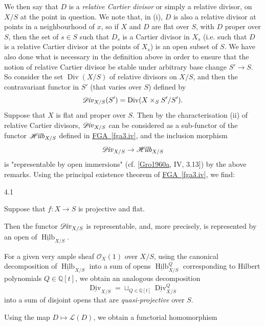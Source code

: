   We then say that \(D\) is a \emph{relative Cartier divisor} or simply a relative divisor, on \(X/S\) at the point in question.
  We note that, in (i), \(D\) is also a relative divisor at points in a neighbourhood of \(x\), so if \(X\) and \(D\) are flat over \(S\), with \(D\) proper over \(S\), then the set of \(s\in  S\) such that \(D_s\) is a Cartier divisor in \(X_s\) (i.e. such that \(D\) is a relative Cartier divisor at the points of \(X_s\)) is an open subset of \(S\).
  We have also done what is necessary in the definition above in order to ensure that the notion of relative Cartier divisor be stable under arbitrary base change \(S'\to  S\).
  So consider the set \(\operatorname {Div}(X/S)\) of relative divisors on \(X/S\), and then the contravariant functor in \(S'\) (that varies over \(S\)) defined by
  \[     \mathscr {D}\kern  -1pt\mathit {iv}_{X/S}(S')     = \operatorname {Div}(X\times _S S'/S').   \]
  Suppose that \(X\) is flat and proper over \(S\).
  Then by the characterisation (ii) of relative Cartier divisors, \(\mathscr {D}\kern  -1pt\mathit {iv}_{X/S}\) can be considered as a sub-functor of the functor \(\mathscr {H}\kern  -1.75pt\mathit {ilb}_{X/S}\) defined in \hyperref[fga3.iv]{FGA~\ref*{fga3.iv}}, and the inclusion morphism
  \[     \mathscr {D}\kern  -1pt\mathit {iv}_{X/S}     \to  \mathscr {H}\kern  -1.75pt\mathit {ilb}_{X/S}   \]
  is "representable by open immersions" (cf. [\hyperref[Gro1960a]{Gro1960a}, IV, 3.13]) by the above remarks.
  Using the principal existence theorem of \hyperref[fga3.iv]{FGA~\ref*{fga3.iv}}, we find:\begin{proposition}{4.1}\label{fga3.v-4-proposition-4.1}\skipsinglepar\par{}Suppose that \(f\colon  X\to  S\) is projective and flat.
    
    Then the functor \(\mathscr {D}\kern  -1pt\mathit {iv}_{X/S}\) is representable, and, more precisely, is represented by an open of \(\underline {\operatorname {Hilb}}_{X/S}\).\end{proposition}\par{}For a given very ample sheaf \(\mathcal {O}_X(1)\) over \(X/S\), using the canonical decomposition of \(\underline {\operatorname {Hilb}}_{X/S}\) into a sum of opens \(\underline {\operatorname {Hilb}}_{X/S}^Q\) corresponding to Hilbert polynomials \(Q\in \mathbb {Q}[t]\), we obtain an analogous decomposition
  \[     \underline {\operatorname {Div}}_{X/S}     = \sqcup _{Q\in \mathbb {Q}[t]} \underline {\operatorname {Div}}_{X/S}^Q   \]
  into a sum of disjoint opens that are \emph{quasi-projective} over \(S\).\par{}Using the map \(D\mapsto \mathscr {L}(D)\), we obtain a functorial homomorphism
